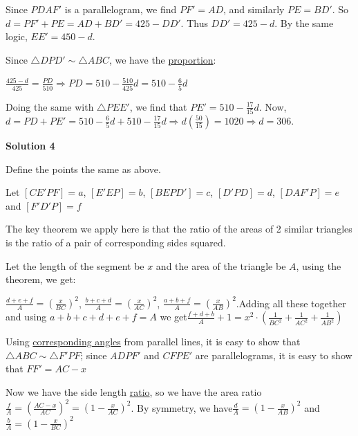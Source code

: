 \begin{enumerate}
 Since $PDAF'$ is a parallelogram, we find $PF' = AD$, and similarly $PE = BD'$. So $d = PF' + PE = AD + BD' = 425 - DD'$. Thus $DD' = 425 - d$. By the same logic, $EE' = 450 - d$. 

 Since $\triangle DPD' \sim \triangle ABC$, we have the \href{https://artofproblemsolving.com/wiki/index.php?title=Proportion}{proportion}:

 $\frac{425-d}{425} = \frac{PD}{510} \Longrightarrow PD = 510 - \frac{510}{425}d = 510 - \frac{6}{5}d$

 Doing the same with $\triangle PEE'$, we find that $PE' =510 - \frac{17}{15}d$. Now, $d = PD + PE' = 510 - \frac{6}{5}d + 510 - \frac{17}{15}d \Longrightarrow d\left(\frac{50}{15}\right) = 1020 \Longrightarrow d = \boxed{306}$.

 



\textbf{Solution 4}

Define the points the same as above.

 Let $[CE'PF] = a$, $[E'EP] = b$, $[BEPD'] = c$, $[D'PD] = d$, $[DAF'P] = e$ and $[F'D'P] = f$

 The key theorem we apply here is that the ratio of the areas of 2 similar triangles is the ratio of a pair of corresponding sides squared.

 Let the length of the segment be $x$ and the area of the triangle be $A$, using the theorem, we get:

 $\frac {d + e + f}{A} = \left(\frac {x}{BC}\right)^2$, $\frac {b + c + d}{A}= \left(\frac {x}{AC}\right)^2$, $\frac {a + b + f}{A} = \left(\frac {x}{AB}\right)^2$.Adding all these together and using $a + b + c + d + e + f = A$ we get$\frac {f + d + b}{A} + 1 = x^2 \cdot \left(\frac {1}{BC^2} + \frac {1}{AC^2} + \frac {1}{AB^2}\right)$

 Using \href{https://artofproblemsolving.com/wiki/index.php?title=Corresponding\_angles&action=edit&redlink=1}{corresponding angles} from parallel lines, it is easy to show that $\triangle ABC \sim \triangle F'PF$; since $ADPF'$ and $CFPE'$ are parallelograms, it is easy to show that $FF' = AC - x$

 Now we have the side length \href{https://artofproblemsolving.com/wiki/index.php?title=Ratio}{ratio}, so we have the area ratio$\frac {f}{A} = \left(\frac {AC - x}{AC}\right)^2 = \left(1 - \frac {x}{AC}\right)^2$. By symmetry, we have$\frac {d}{A} = \left(1 - \frac {x}{AB}\right)^2$ and $\frac {b}{A} = \left(1 - \frac {x}{BC}\right)^2$


\end{enumerate}
